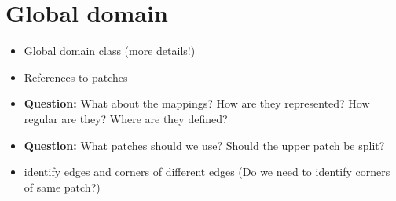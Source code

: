 \documentclass[presentation.tex]{subfiles}
\begin{document}
\section*{Global domain}
\begin{itemize}
    \item Global domain class (more details!)
    \item References to patches
    \item \textbf{Question:} What about the mappings? How are they represented?
            How regular are they? Where are they defined?
    \item \textbf{Question:} What patches should we use? Should the upper patch
            be split?
    \item identify edges and corners of different edges (Do we need to identify
        corners of same patch?)
\end{itemize}
\end{document}
